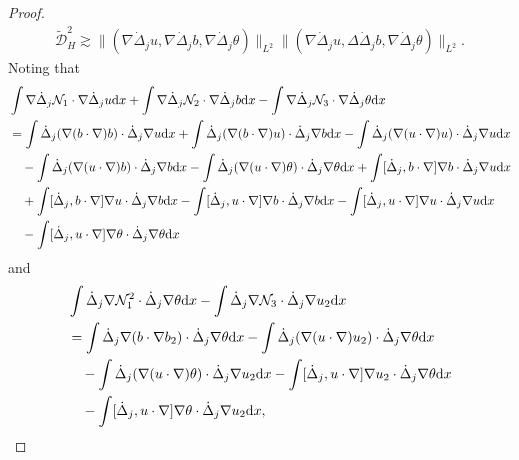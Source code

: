 \documentclass[reqno]{amsart}
\begin{document}
\begin{proof}
\begin{equation}
\begin{gathered}
 \tilde{\mathcal{D}}_H^2\gtrsim\|(\nabla\dot{\Delta}_ju,\nabla\dot{\Delta}_jb,\nabla\dot{\Delta}_j\theta)\|_{L^2}\|(\nabla\dot{\Delta}_ju,\Delta\dot{\Delta}_jb,\nabla\dot{\Delta}_j\theta)\|_{L^2}.
\end{gathered}
\end{equation}
Noting that
\begin{align*}
&\int\nabla\dot{\Delta}_j \mathcal{N}_1\cdot \nabla\dot{\Delta}_ju{\rm d}x
 +\int\nabla\dot{\Delta}_j \mathcal{N}_2\cdot\nabla \dot{\Delta}_jb{\rm d}x
 -\int\nabla\dot{\Delta}_j \mathcal{N}_3\cdot \nabla\dot{\Delta}_j\theta{\rm d}x \\
&=\int\dot{\Delta}_j(\nabla (b\cdot\nabla) b)\cdot\dot{\Delta}_j\nabla u{\rm d}x
 +\int\dot{\Delta}_j(\nabla (b\cdot\nabla) u)\cdot\dot{\Delta}_j\nabla b{\rm d}x
 -\int\dot{\Delta}_j(\nabla (u\cdot\nabla) u)\cdot\dot{\Delta}_j\nabla u{\rm d}x \\
&\quad-\int\dot{\Delta}_j(\nabla (u\cdot\nabla) b)\cdot\dot{\Delta}_j\nabla b{\rm d}x
 -\int\dot{\Delta}_j(\nabla (u\cdot\nabla) \theta)\cdot\dot{\Delta}_j\nabla \theta{\rm d}x
 +\int[\dot{\Delta}_j, b\cdot\nabla]\nabla b\cdot\dot{\Delta}_j\nabla u{\rm d}x \\
 &\quad +\int[\dot{\Delta}_j, b\cdot\nabla]\nabla u\cdot\dot{\Delta}_j\nabla b{\rm d}x
 -\int[\dot{\Delta}_j, u\cdot\nabla]\nabla b\cdot\dot{\Delta}_j\nabla b{\rm d}x
 -\int[\dot{\Delta}_j, u\cdot\nabla]\nabla u\cdot\dot{\Delta}_j\nabla u{\rm d}x \\
&\quad -\int[\dot{\Delta}_j, u\cdot\nabla]\nabla \theta\cdot\dot{\Delta}_j\nabla 
 \theta{\rm d}x
\end{align*}
and
\begin{equation}\label{3.20}
\begin{aligned}
&\int\dot{\Delta}_j\nabla \mathcal{N}_1^2\cdot\dot{\Delta}_j\nabla\theta{\rm d}x
 -\int\dot{\Delta}_j\nabla\mathcal{N}_3\cdot\dot{\Delta}_j\nabla u_2{\rm d}x \\
&=\int\dot{\Delta}_j\nabla (b\cdot\nabla b_2)\cdot\dot{\Delta}_j\nabla \theta{\rm d}x
 -\int\dot{\Delta}_j(\nabla (u\cdot\nabla) u_2)\cdot\dot{\Delta}_j\nabla \theta{\rm d}x\\
&\quad -\int\dot{\Delta}_j(\nabla (u\cdot\nabla) \theta)
 \cdot\dot{\Delta}_j\nabla u_2{\rm d}x
 -\int[\dot{\Delta}_j, u\cdot\nabla]\nabla u_2\cdot\dot{\Delta}_j\nabla \theta{\rm d}x \\
&\quad -\int[\dot{\Delta}_j, u\cdot\nabla]\nabla \theta\cdot\dot{\Delta}_j\nabla u_2{\rm d}x,

\end{aligned}
\end{equation}
\end{proof}
\end{document}
